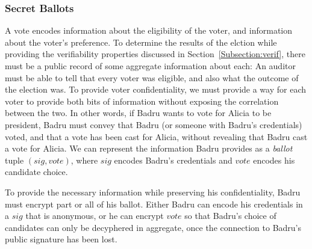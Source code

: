   \subsubsection{Secret Ballots}
  A vote encodes information about the eligibility of the voter, and
  information about the voter's preference. To determine the results of the
  elction while providing the verifiability properties discussed in
  Section~\ref{Subsection:verif}, there must be a public record of some
  aggregate information about each: An auditor must be able to tell that every
  voter was eligible, and also what the outcome of the election was. To provide
  voter confidentiality, we must provide a way for each voter to provide both
  bits of information without exposing the correlation between the two. In
  other words, if Badru wants to vote for Alicia to be president, Badru must
  convey that Badru (or someone with Badru's credentials) voted, and that a
  vote has been cast for Alicia, without revealing that Badru cast a vote for
  Alicia. We can represent the information Badru provides as a
  \emph{ballot} tuple $(sig, vote)$, where $sig$ encodes Badru's credentials and
  $vote$ encodes his candidate choice.

  To provide the necessary information while preserving his
  confidentiality, Badru must encrypt part or all of his ballot.
  Either Badru can encode his credentials in a $sig$ that is
  anonymous\cite{lrs}, or he can
  encrypt $vote$ so that Badru's choice of candidates can only be decyphered in
  aggregate, once the connection to Badru's public signature has been lost.

